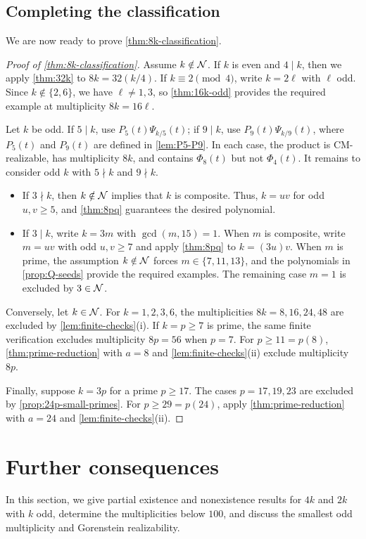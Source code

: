 \documentclass[11pt,a4paper]{amsart}
\theoremstyle{definition}
\theoremstyle{remark}
\newcommand{\Nc}{{\cal N}}
\begin{document}
\subsection{Completing the classification}
We are now ready to prove \cref{thm:8k-classification}.
\begin{proof}[Proof of \cref{thm:8k-classification}]
Assume $k\notin\Nc$. If $k$ is even and $4\mid k$, then we apply \cref{thm:32k} to $8k=32(k/4)$. If $k\equiv2\pmod4$, write $k=2\ell$ with $\ell$ odd. Since $k\notin\{2,6\}$, we have $\ell\ne1,3$, so \cref{thm:16k-odd} provides the required example at multiplicity $8k=16\ell$.

Let $k$ be odd. If $5\mid k$, use $P_5(t)\Psi_{k/5}(t)$; if $9\mid k$, use $P_9(t)\Psi_{k/9}(t)$, where $P_5(t)$ and $P_9(t)$ are defined in \cref{lem:P5-P9}. In each case, the product is CM-realizable, has multiplicity $8k$, and contains $\Phi_8(t)$ but not $\Phi_4(t)$. It remains to consider odd $k$ with $5\nmid k$ and $9\nmid k$.
\begin{itemize}
\item If $3\nmid k$, then $k\notin\Nc$ implies that $k$ is composite. Thus, $k=uv$ for odd $u,v\ge5$, and \cref{thm:8pq} guarantees the desired polynomial.
\item If $3\mid k$, write $k=3m$ with $\gcd(m,15)=1$. When $m$ is composite, write $m=uv$ with odd $u,v\ge7$ and apply \cref{thm:8pq} to $k=(3u)v$. When $m$ is prime, the assumption $k\notin\Nc$ forces $m\in\{7,11,13\}$, and the polynomials in \cref{prop:Q-seeds} provide the required examples. The remaining case $m=1$ is excluded by $3\in\Nc$.
\end{itemize}

Conversely, let $k\in\Nc$. For $k=1,2,3,6$, the multiplicities $8k=8,16,24,48$ are excluded by \cref{lem:finite-checks}\textup{(i)}. If $k=p\ge7$ is prime, the same finite verification excludes multiplicity $8p=56$ when $p=7$. For $p\ge11=p(8)$, \cref{thm:prime-reduction} with $a=8$ and \cref{lem:finite-checks}\textup{(ii)} exclude multiplicity $8p$.

Finally, suppose $k=3p$ for a prime $p\ge17$. The cases $p=17,19,23$ are excluded by \cref{prop:24p-small-primes}. For $p\ge29=p(24)$, apply \cref{thm:prime-reduction} with $a=24$ and \cref{lem:finite-checks}\textup{(ii)}.
\end{proof}

\bigskip
\section{Further consequences}\label{sec:further}
In this section, we give partial existence and nonexistence results for $4k$ and $2k$ with $k$ odd, determine the multiplicities below $100$, and discuss the smallest odd multiplicity and Gorenstein realizability.
\end{document}
